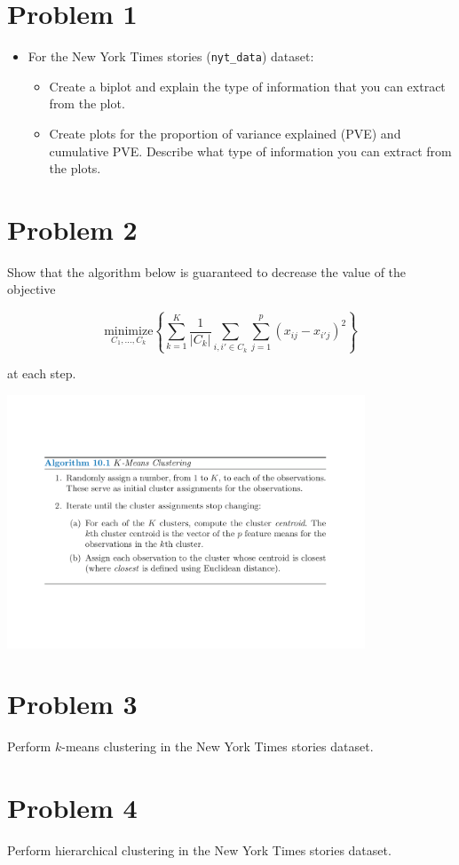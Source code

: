 \documentclass[
]{article}
\providecommand{\tightlist}{%
  \setlength{\itemsep}{0pt}\setlength{\parskip}{0pt}}
\begin{document}
\hypertarget{problem-1}{%
\section{Problem 1}\label{problem-1}}

\begin{itemize}
\tightlist
\item
  For the New York Times stories (\texttt{nyt\_data}) dataset:

  \begin{itemize}
  \tightlist
  \item
    Create a biplot and explain the type of information that you can
    extract from the plot.
  \item
    Create plots for the proportion of variance explained (PVE) and
    cumulative PVE. Describe what type of information you can extract
    from the plots.
  \end{itemize}
\end{itemize}

\hypertarget{problem-2}{%
\section{Problem 2}\label{problem-2}}

Show that the algorithm below is guaranteed to decrease the value of the
objective

\[\underset{C_1, \ldots, C_k}{\text{minimize}}\left\{\sum_{k=1}^{K} \frac{1}{|C_k|} \sum_{i, i' \in C_k} \sum_{j=1}^{p}(x_{ij} - x_{i'j})^2 \right\}\]

at each step.

\center

\includegraphics[width=0.8\textwidth,height=\textheight]{kmeans_algo.pdf}

\flushleft

\hypertarget{problem-3}{%
\section{Problem 3}\label{problem-3}}

Perform \(k\)-means clustering in the New York Times stories dataset.

\hypertarget{problem-4}{%
\section{Problem 4}\label{problem-4}}

Perform hierarchical clustering in the New York Times stories dataset.
\end{document}

